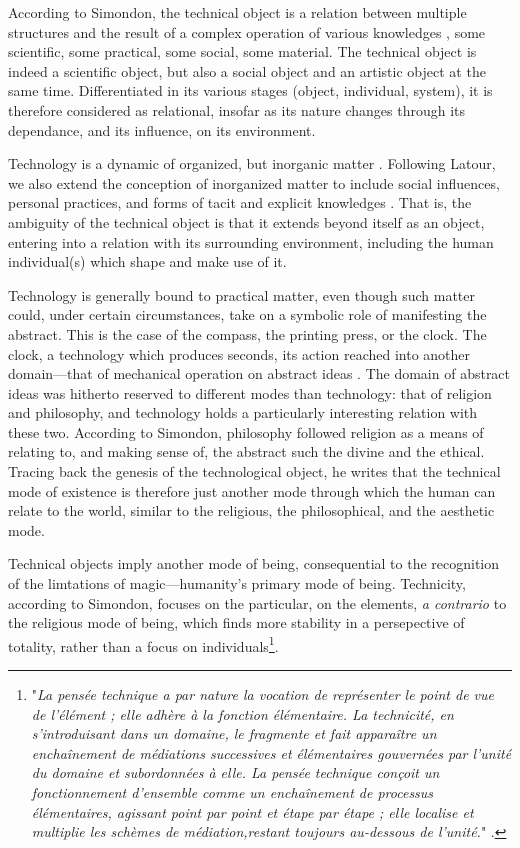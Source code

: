 According to Simondon, the technical object is a relation between multiple structures and the result of a complex operation of various knowledges \citep{simondon_mode_1958}, some scientific, some practical, some social, some material. The technical object is indeed a scientific object, but also a social object and an artistic object at the same time. Differentiated in its various stages (object, individual, system), it is therefore considered as relational, insofar as its nature changes through its dependance, and its influence, on its environment.

Technology is a dynamic of organized, but inorganic matter \citep{stiegler_technics_1998}. Following Latour, we also extend the conception of inorganized matter to include social influences, personal practices, and forms of tacit and explicit knowledges \citep{latour_reassembling_2007}. That is, the ambiguity of the technical object is that it extends beyond itself as an object, entering into a relation with its surrounding environment, including the human individual(s) which shape and make use of it.

Technology is generally bound to practical matter, even though such matter could, under certain circumstances, take on a symbolic role of manifesting the abstract. This is the case of the compass, the printing press, or the clock. The clock, a technology which produces seconds, its action reached into another domain—that of mechanical operation on abstract ideas \citep{mumford_technics_1934}. The domain of abstract ideas was hitherto reserved to different modes than technology: that of religion and philosophy, and technology holds a particularly interesting relation with these two. According to Simondon, philosophy followed religion as a means of relating to, and making sense of, the abstract such the divine and the ethical. Tracing back the genesis of the technological object, he writes that the technical mode of existence is therefore just another mode through which the human can relate to the world, similar to the religious, the philosophical, and the aesthetic mode\citep{simondon_mode_1958}.

Technical objects imply another mode of being, consequential to the recognition of the limtations of magic—humanity's primary mode of being. Technicity, according to Simondon, focuses on the particular, on the elements, \emph{a contrario} to the religious mode of being, which finds more stability in a persepective of totality, rather than a focus on individuals\footnote{"\emph{La pensée technique a par nature la vocation de représenter le point de vue de l'élément ; elle adhère à la fonction élémentaire. La technicité, en s'introduisant dans un domaine, le fragmente et fait apparaître un enchaînement de médiations successives et élémentaires gouvernées par l'unité du domaine et subordonnées à elle. La pensée technique conçoit un fonctionnement d'ensemble comme un enchaînement de processus élémentaires, agissant point par point et étape par étape ; elle localise et multiplie les schèmes de médiation,restant toujours au-dessous de l'unité.}" \citep{simondon_mode_1958}.}.

